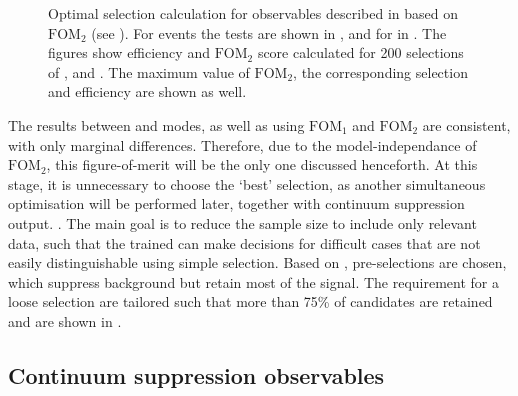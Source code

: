 \begin{figure}[htbp!]
{        }
    \caption{\label{fig:selection_optimisations} Optimal selection calculation for observables
    described in  based on $\mathrm{FOM}_2$ (see ).
    For \BptoXsgamma events the tests are shown
    in ,
    and for \BztoXsgamma in .
    The figures show efficiency and $\mathrm{FOM}_2$ score calculated for 200 selections of \piVeto, \etaVeto and \ZMVA.
    The maximum value of $\mathrm{FOM}_2$, the corresponding selection and efficiency are shown as well.
    }
\end{figure}

The results between \Bp and \Bz modes, as well as using $\mathrm{FOM}_1$ and $\mathrm{FOM}_2$ are consistent, with only marginal differences.
Therefore, due to the model-independance of $\mathrm{FOM}_2$, this figure-of-merit will be the only one discussed henceforth.
At this stage, it is unnecessary to choose the `best' selection, as another simultaneous optimisation will be performed later, together with continuum suppression \BDT output.
. 
The main goal is to reduce the sample size to include only relevant data, such that the trained \BDT can make decisions for difficult cases that are not easily distinguishable using simple selection.
Based on , pre-selections are chosen, which suppress background but retain most of the signal.
The requirement for a loose selection are tailored such that more than 75\% of \BtoXsgamma candidates are retained and are shown in .

\begin{table}[htbp!]
    \centering
    \caption{\label{tab:preselections} }
    
\end{table}

\subsection{Continuum suppression observables}\label{sec:continuum_features}

